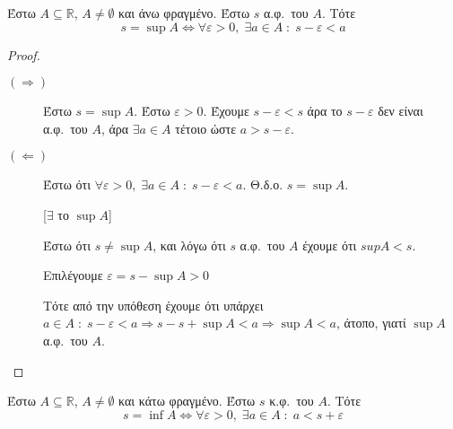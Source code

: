 \documentclass[main.tex]{subfiles}
\begin{document}
\begin{mypropbox}
  Έστω $ A \subseteq \mathbb{R} $, $ A \neq \emptyset $ και άνω φραγμένο. 
  Έστω $ s $ α.φ.\ του $A$. Τότε 
  \[
    s= \sup A \Leftrightarrow \forall \varepsilon >0, \; \exists a \in A \; 
    : \; s - \varepsilon < a
  \]
\end{mypropbox}
\begin{proof}
\item {}
  \begin{description}
    \item[$ (\Rightarrow) $] 
      Έστω $ s = \sup A $. Έστω $ \varepsilon >0 $. Έχουμε $ 
      s - \varepsilon < s $ άρα το $ s- \varepsilon $ δεν είναι 
      α.φ.\ του $A$, άρα $ \exists a \in A $ τέτοιο ώστε $ 
      a > s- \varepsilon$. 

    \item [$ (\Leftarrow) $] 
      Έστω ότι $ \forall \varepsilon >0, \; \exists a \in A \; : 
      \; s- \varepsilon < a$. Θ.δ.ο. $ s = \sup A $. 

      \begin{minipage}{0.18\textwidth}
      \end{minipage}

      [$ \exists $ το $ \sup A $]

      Έστω ότι $ s \neq \sup A $, και λόγω ότι $ s $ α.φ.\ του $A$ 
      έχουμε ότι $sup A < s $. 

      Επιλέγουμε $ \varepsilon = s - \sup A > 0 $

      Τότε από την υπόθεση έχουμε ότι 
      υπάρχει $ a \in A \; : \; s - \varepsilon < a \Rightarrow s 
      - s + \sup A < a \Rightarrow \sup A < a $, άτοπο, γιατί 
      $ \sup A $ α.φ.\ του $A$.  
  \end{description} 
\end{proof}

\begin{mypropbox}
  Έστω $ A \subseteq \mathbb{R} $, $ A \neq \emptyset $ και κάτω  φραγμένο. 
  Έστω $ s $ κ.φ.\ του $A$. Τότε 
  \[
    s= \inf A \Leftrightarrow \forall \varepsilon >0, \; \exists a \in A \; 
    : \; a < s + \varepsilon  
  \]
\end{mypropbox}
\end{document}
